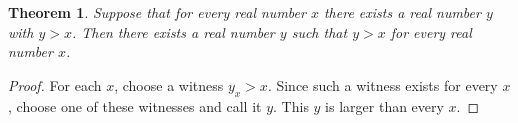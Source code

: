 \documentclass{article}
\newtheorem{theorem}{Theorem}
\begin{document}
\begin{theorem}\label{thm:quantifier-swap}
Suppose that for every real number $x$ there exists a real number $y$ with
$y>x$. Then there exists a real number $y$ such that $y>x$ for every real
number $x$.
\end{theorem}
\begin{proof}
For each $x$, choose a witness $y_x>x$. Since such a witness exists for
every $x$, choose one of these witnesses and call it $y$. This $y$ is larger
than every $x$.
\end{proof}
\end{document}
